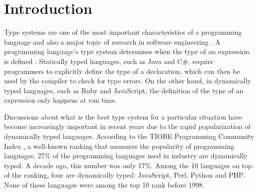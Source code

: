\documentclass[msc]{ppgccufmg}
\begin{document}





\newcommand{\dummytxt}{\dummytxta\dummytxtb\dummytxtc}

\chapter{Introduction}

Type systems are one of the most important characteristics of a programming language and also a major topic of research in software engineering \cite{Furr09,takikawa12,types_and_programming_languages,gradual_typing}.
A programming language's type system determines when the type of an expression is defined \cite{types_and_programming_languages}. 
Statically typed languages, such as Java and C\#, require programmers to explicitly define the type of a declaration, which can then be used by the compiler to check for type errors. 
On the other hand, in dynamically typed languages, such as Ruby and JavaScript, the definition of the type of an expression only happens at run time.

Discussions about what is the best type system for a particular situation have become increasingly important in recent years due to the rapid popularization of dynamically typed languages. 
According to the TIOBE Programming Community Index \cite{tiobe}, a well-known ranking that measures the popularity of programming languages, 27\% of the programming languages used in industry are dynamically typed. 
A decade ago, this number was only 17\%. 
Among the 10 languages on top of the ranking, four are dynamically typed: JavaScript, Perl, Python and PHP. 
None of these languages were among the top 10 rank before 1998.
\end{document}
